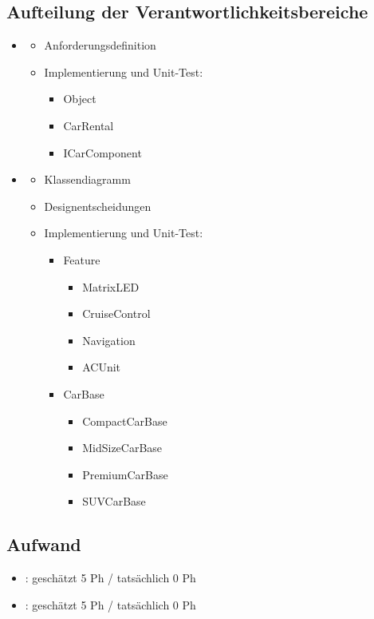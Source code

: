 \subsection{Aufteilung der Verantwortlichkeitsbereiche}
\begin{itemize}
	\item \docauthor
	\begin{itemize}
		\item Anforderungsdefinition
		\item Implementierung und Unit-Test:
		\begin{itemize}
			\item Object
			\item CarRental
			\item ICarComponent
		\end{itemize}
	\end{itemize}
	\item \doccoauthor
	\begin{itemize}
		\item Klassendiagramm
		\item Designentscheidungen
		\item Implementierung und Unit-Test:
		\begin{itemize}
			\item Feature
			\begin{itemize}
				\item MatrixLED
				\item CruiseControl
				\item Navigation
				\item ACUnit
			\end{itemize}
			
			\item CarBase
			\begin{itemize}
				\item CompactCarBase
				\item MidSizeCarBase
				\item PremiumCarBase
				\item SUVCarBase
			\end{itemize}
		\end{itemize}
	\end{itemize}	
\end{itemize}

\subsection{Aufwand}

\begin{itemize}
	\item \docauthor: geschätzt 5 Ph / tatsächlich 0 Ph
	\item \doccoauthor: geschätzt 5 Ph / tatsächlich 0 Ph
\end{itemize}

